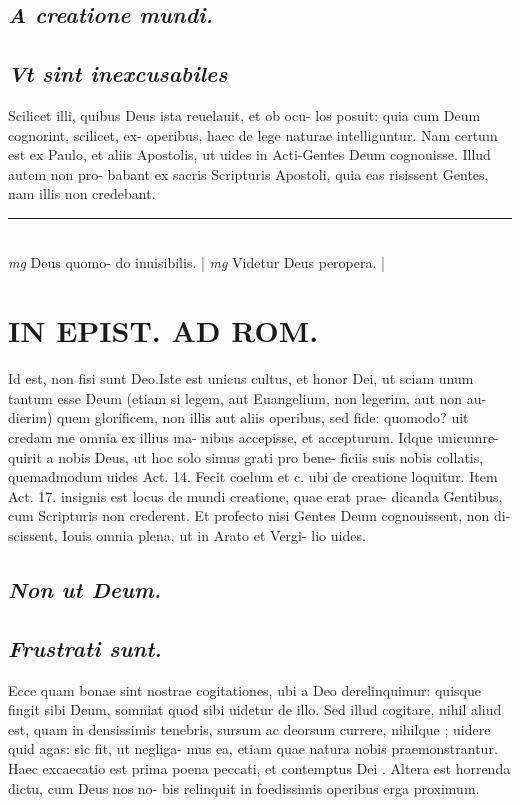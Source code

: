 \documentclass{article}
\begin{document}
\begin{pages}
\subsection*{\textit{A creatione mundi. }}
{}
\subsection*{\textit{Vt sint inexcusabiles }}\pstart Scilicet illi, quibus Deus ista reuelauit, et ob ocu- los posuit: quia cum Deum cognorint, scilicet, ex- operibus, haec de lege naturae intelliguntur. Nam certum est ex Paulo, et aliis Apostolis, ut uides in Acti-Gentes Deum cognouisse. Illud autem non pro- babant ex sacris Scripturis Apostoli, quia eas risissent Gentes, nam illis non credebant.   \pend
\vspace{0.5cm}\noindent
\vspace{0.2cm}\rule{1cm}{0.2pt}\\ 
\hspace{0.2cm}\textit{mg}
\footnotesize Deus quomo- do inuisibilis.  
\normalsize| 
\hspace{0.2cm}\textit{mg}
\footnotesize Videtur Deus peropera.  
\normalsize| 
\section*{IN EPIST. AD ROM.  }
\marginpar{[ p.2 ]}\pstart Id est, non fisi sunt Deo.Iste est unicus cultus, et honor Dei, ut sciam unum tantum esse Deum (etiam si legem, aut Euangelium, non legerim, aut non au- dierim) quem glorificem, non illis aut aliis operibus, sed fide: quomodo? uit credam me omnia ex illius ma- nibus accepisse, et accepturum. Idque unicumre- quirit a nobis Deus, ut hoc solo simus grati pro bene- ficiis suis nobis collatis, quemadmodum uides Act. 14.  Fecit coelum et c. ubi de creatione loquitur. Item Act. 17.  insignis est locus de mundi creatione, quae erat prae- dicanda Gentibus, cum Scripturis non crederent.  Et profecto nisi Gentes Deum cognouissent, non di- scissent, Iouis omnia plena, ut in Arato et Vergi- lio uides.  \pend
{}
{}
\subsection*{\textit{Non ut Deum. }}
{}
\subsection*{\textit{Frustrati sunt. }}\pstart Ecce quam bonae sint nostrae cogitationes, ubi a Deo derelinquimur: quisque fingit sibi Deum, somniat quod sibi uidetur de illo. Sed illud cogitare, nihil aliud est, quam in densissimis tenebris, sursum ac deorsum currere, nihilque ; uidere quid agas: sic fit, ut negliga- mus ea, etiam quae natura nobis praemonstrantur. Haec excaecatio est prima poena peccati, et contemptus Dei . Altera est horrenda dictu, cum Deus nos no- bis relinquit in foedissimis operibus erga proximum.   \pend
{}
{}

\end{pages}
\end{document}

